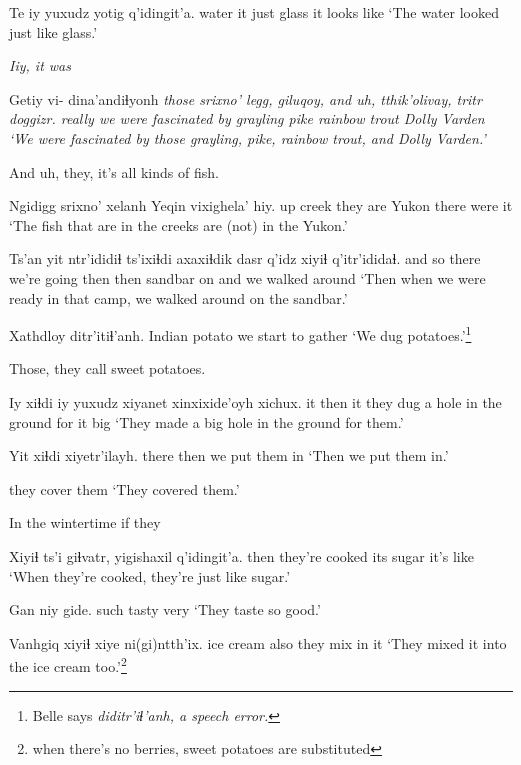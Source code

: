 \documentclass[12pt]{article}
\begin{document}
\gll Te    iy  yuxudz yotig q'idingit'a.
water it  just   glass {it looks like}
\glt `The water looked just like glass.'
\glend

\em Iiy, \em it was

\gll Getiy vi- dina'andiɬyonh        \em those  {srixno' legg,}  giluqoy, {and uh,} tthik'olivay, {tritr doggizr.}  
really {} {we were fascinated by}    {}  grayling        pike    {}         {rainbow trout} {Dolly Varden}
\glt `We were fascinated by those grayling, pike, rainbow trout, and Dolly Varden.'
\glend

And uh, they, it's all kinds of fish.

\gll Ngidigg srixno' xelanh   Yeqin vixighela' hiy.
up      creek   {they are} Yukon {there were}  it
\glt `The fish that are in the creeks are (not) in the Yukon.'
\glend

\gll Ts'an  yit ntr'ididiɬ    ts'ixiɬdi axaxiɬdik dasr    q'idz xiyiɬ q'itr'ididaɬ.
{and so} there {we're going} then   then      sandbar on    and   {we walked around}
\glt `Then when we were ready in that camp, we walked around on the sandbar.'
\glend

\gll Xathdloy      ditr'itiɬ'anh.
{Indian potato} {we start to gather}
\glt `We dug potatoes.'\footnote{Belle says \em diditr'iɬ'anh, \em a speech error.}
\glend

Those, they call sweet potatoes.

\gll Iy xiɬdi iy     yuxudz {xiyanet xinxixide'oyh}                xichux.
it then it {}    {they dug a hole in the ground for it} big
\glt `They made a big hole in the ground for them.'
\glend

\gll Yit xiɬdi  xiyetr'ilayh.
there then {we put them in}
\glt `Then we put them in.'
\glend

{{they cover them}}
\glt `They covered them.'
\glend

In the wintertime if they

\gll Xiyiɬ ts'i giɬvatr,        yigishaxil q'idingit'a.
then   {}  {they're cooked} {its sugar} {it's like}
\glt `When they're cooked, they're just like sugar.'
\glend

\gll Gan  niy   gide.
such tasty very
\glt `They taste so good.'
\glend

\gll Vanhgiq   xiyiɬ {xiye ni(gi)ntth'ix}.
{ice cream} also  {they mix in it}
\glt `They mixed it into the ice cream too.'\footnote{when there's no berries, sweet potatoes are substituted}
\glend
 
\end{document}

